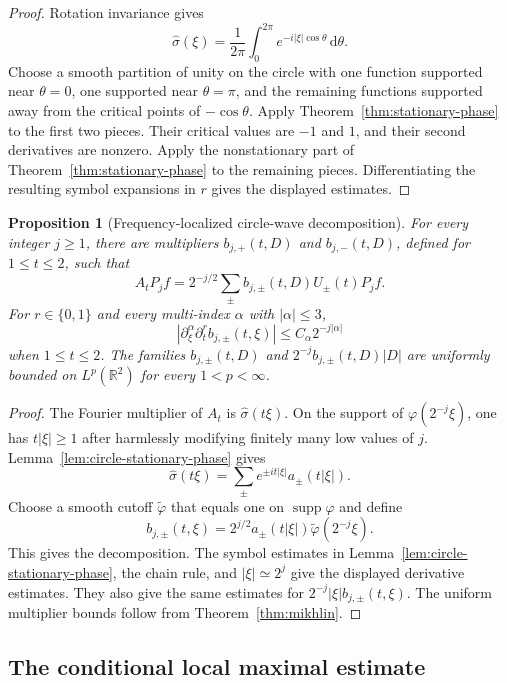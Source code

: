 \documentclass[11pt]{article}
\numberwithin{equation}{section}
\newtheorem{proposition}[theorem]{Proposition}
\theoremstyle{definition}
\theoremstyle{remark}
\newcommand{\R}{\mathbb R}
\newcommand{\supp}{\operatorname{supp}}
\newcommand{\dd}{\,\mathrm d}
\begin{document}
\begin{proof}
Rotation invariance gives
\[
\widehat\sigma(\xi)=\frac1{2\pi}\int_0^{2\pi}e^{-i|\xi|\cos\theta}\dd\theta.
\]
Choose a smooth partition of unity on the circle with one function supported near $\theta=0$, one supported near $\theta=\pi$, and the remaining functions supported away from the critical points of $-\cos\theta$.  Apply Theorem~\ref{thm:stationary-phase} to the first two pieces.  Their critical values are $-1$ and $1$, and their second derivatives are nonzero.  Apply the nonstationary part of Theorem~\ref{thm:stationary-phase} to the remaining pieces.  Differentiating the resulting symbol expansions in $r$ gives the displayed estimates.
\end{proof}

\begin{proposition}[Frequency-localized circle-wave decomposition]\label{prop:circle-wave-decomposition}
For every integer $j\ge1$, there are multipliers $b_{j,+}(t,D)$ and $b_{j,-}(t,D)$, defined for $1\le t\le2$, such that
\[
A_tP_jf=2^{-j/2}\sum_{\pm}b_{j,\pm}(t,D)U_\pm(t)P_jf.
\]
For $r\in\{0,1\}$ and every multi-index $\alpha$ with $|\alpha|\le3$,
\[
|\partial_\xi^\alpha\partial_t^rb_{j,\pm}(t,\xi)|\le C_\alpha2^{-j|\alpha|}
\]
when $1\le t\le2$.  The families $b_{j,\pm}(t,D)$ and $2^{-j}b_{j,\pm}(t,D)|D|$ are uniformly bounded on $L^p(\R^2)$ for every $1<p<\infty$.
\end{proposition}

\begin{proof}
The Fourier multiplier of $A_t$ is $\widehat\sigma(t\xi)$.  On the support of $\varphi(2^{-j}\xi)$, one has $t|\xi|\ge1$ after harmlessly modifying finitely many low values of $j$.  Lemma~\ref{lem:circle-stationary-phase} gives
\[
\widehat\sigma(t\xi)=\sum_{\pm}e^{\pm it|\xi|}a_\pm(t|\xi|).
\]
Choose a smooth cutoff $\widetilde\varphi$ that equals one on $\supp\varphi$ and define
\[
b_{j,\pm}(t,\xi)=2^{j/2}a_\pm(t|\xi|)\widetilde\varphi(2^{-j}\xi).
\]
This gives the decomposition.  The symbol estimates in Lemma~\ref{lem:circle-stationary-phase}, the chain rule, and $|\xi|\simeq2^j$ give the displayed derivative estimates.  They also give the same estimates for $2^{-j}|\xi|b_{j,\pm}(t,\xi)$.  The uniform multiplier bounds follow from Theorem~\ref{thm:mikhlin}.
\end{proof}

\subsection{The conditional local maximal estimate}
\end{document}

